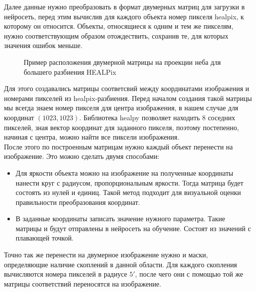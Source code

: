 Далее данные нужно преобразовать в формат двумерных матриц для загрузки в нейросеть, перед этим 
вычислив для каждого объекта номер пикселя healpix, к которому он относится. Объекты, относящиеся 
к одним и тем же пикселям, нужно соответствующим образом отождествить, сохранив те, для которых 
значения ошибок меньше.\\

\begin{figure}[ht]
	\caption{Пример расположения двумерной матрицы на проекции неба для большего разбиения HEALPix}
\end{figure}

Для этого создавались матрицы соответсвий между координатами изображения и номерами пикселей из 
healpix-разбиения. Перед началом создания такой матрицы мы всегда знаем номер пикселя для центра 
изображения, в нашем случае для координат $(1023, 1023)$. Библиотека healpy позволяет находить 8
соседних пикселей, зная вектор координат для заданного пикселя, поэтому постепенно, начиная с центра,
можно найти все пиксели изображения.\\

После этого по построенным матрицам нужно каждый объект перенести на изображение.
Это можно сделать двумя способами:

\begin{itemize}
	\item Для яркости объекта можно на изображение на полученные координаты нанести круг с 
		радиусом, пропорциональным яркости. Тогда матрица будет состоять из нулей и единиц. Такой 
		метод подходит для визуальной оценки правильности преобразования координат.
	\item В заданные координаты записать значение нужного параметра. Такие матрицы и будут 
		отправлены в нейросеть на обучение. Состоят из значений с плавающей точкой.
\end{itemize}

Точно так же перенести на двумерное изображение нужно и маски, определяющие наличие скоплений в 
данной области. Для каждого скопления вычисляются номера пикселей в радиусе $5'$, после чего они с 
помощью той же матрицы соответствий переносятся на изображение.\\
